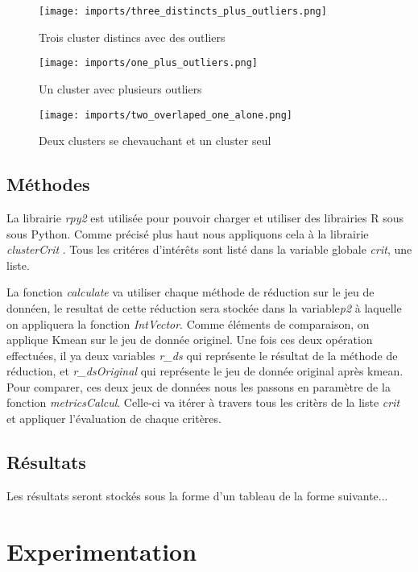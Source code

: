 \begin{center}
    \begin{figure}[ht!]
        \centering
        
        \texttt{[image: imports/three\_distincts\_plus\_outliers.png]}
        
        \caption{Trois cluster distincs avec des outliers}
    \end{figure}
\end{center}

\begin{center}
    \begin{figure}[ht!]
        \centering
        
        \texttt{[image: imports/one\_plus\_outliers.png]}
        
        \caption{Un cluster avec plusieurs outliers}
    \end{figure}
\end{center}


\begin{center}
    \begin{figure}[ht!]
        \centering
        
        \texttt{[image: imports/two\_overlaped\_one\_alone.png]}
        
        \caption{Deux clusters se chevauchant et un cluster seul}
    \end{figure}
\end{center}




\subsection{Méthodes}
La librairie \textit{rpy2} est utilisée pour pouvoir charger et utiliser des librairies R sous sous Python. Comme précisé plus haut
nous appliquons cela à la librairie \textit{clusterCrit} . Tous les critéres d'intérêts sont listé dans la variable globale \textit{crit}, une liste.



La fonction \textit{calculate} va utiliser chaque méthode de réduction sur le jeu de donnéen, le resultat de cette réduction sera stockée dans
la variable\textit{p2} à laquelle on appliquera la fonction \textit{IntVector}. Comme éléments de comparaison, on applique Kmean sur le jeu de donnée originel. 
Une fois ces deux opération effectuées, il ya deux variables \textit{r_ds} qui représente le résultat de la méthode de réduction, et \textit{r_dsOriginal} qui représente
le jeu de donnée original après kmean.
Pour comparer, ces deux jeux de données nous les passons en paramètre de la fonction \textit{metricsCalcul}.
Celle-ci va itérer à travers tous les critèrs de la liste \textit{crit} et appliquer l'évaluation de chaque critères.

\subsection{Résultats}
Les résultats seront stockés sous la forme d'un tableau de la forme suivante...

\section{Experimentation}
